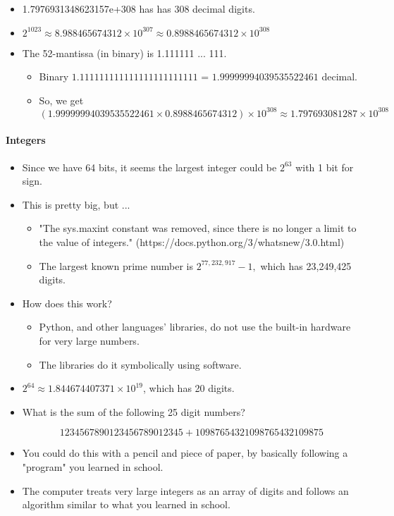 \documentclass[11pt]{article}
\providecommand{\tightlist}{%
      \setlength{\itemsep}{0pt}\setlength{\parskip}{0pt}}
\begin{document}
    \begin{itemize}
\item
  1.7976931348623157e+308 has has 308 decimal digits.
\item
  \(2^{1023} \approx 8.988465674312 \times 10^{307} \approx 0.8988465674312 \times 10^{308}\)
\item
  The 52-mantissa (in binary) is 1.111111 ... 111.

  \begin{itemize}
  \tightlist
  \item
    Binary \(1.111111111111111111111111\) = \(1.99999994039535522461\)
    decimal.
  \item
    So, we get
    \((1.99999994039535522461 \times 0.8988465674312) \times 10^{308} \approx 1.797693081287 \times 10^{308}\)
  \end{itemize}
\end{itemize}

\paragraph{Integers}\label{integers}

\begin{itemize}
\item
  Since we have 64 bits, it seems the largest integer could be
  \(2^{63}\) with 1 bit for sign.
\item
  This is pretty big, but ...

  \begin{itemize}
  \tightlist
  \item
    "The sys.maxint constant was removed, since there is no longer a
    limit to the value of integers."
    (https://docs.python.org/3/whatsnew/3.0.html)
  \item
    The largest known prime number is \(2^{77,232,917} − 1,\) which has
    23,249,425 digits.
  \end{itemize}
\item
  How does this work?

  \begin{itemize}
  \tightlist
  \item
    Python, and other languages' libraries, do not use the built-in
    hardware for very large numbers.
  \item
    The libraries do it symbolically using software.
  \end{itemize}
\item
  \(2^{64} \approx 1.844674407371\times10^{19}\), which has 20 digits.
\item
  What is the sum of the following 25 digit numbers?

  \begin{equation}
  1234567890123456789012345 + 10987654321098765432109875
  \end{equation}
\item
  You could do this with a pencil and piece of paper, by basically
  following a "program" you learned in school.
\item
  The computer treats very large integers as an array of digits and
  follows an algorithm similar to what you learned in school.
\end{itemize}
\end{document}
